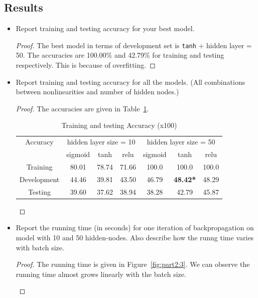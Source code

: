 \documentclass[11pt]{article}
\newcommand{\1}{\mathbf{1}}
\begin{document}
{\subsection{Results}
\begin{itemize}
  \item Report training and testing accuracy for your best model.
  \begin{proof}
    The best model in terms of development set is {\tt tanh} + hidden layer = 50. The accuracies are 100.00\% and 42.79\% for training and testing respectively. This is because of overfitting. 
  \end{proof}{}
  \item Report training and testing accuracy for all the models. (All combinations between nonlinearities and number of hidden nodes.)
  \begin{proof}
    The accuracies are given in Table~\ref{tb:part2:2}. 
    \begin{table}[htbp]
    \centering{}
    \begin{tabular}{c|c|c|c|c|c|c}
    \hline
    Accuracy & \multicolumn{3}{c|}{hidden layer size = 10} & \multicolumn{3}{c}{hidden layer size = 50} \\ \cline{2-7}
     & sigmoid & tanh & relu & sigmoid & tanh & relu \\ \hline
    Training & 80.01 & 78.74 &  71.66 & 100.0 & 100.0 & 100.0 \\ \hline
    Development & 44.46 & 39.81 &  43.50  & 46.79 & \bf 48.42* & 48.29 \\ \hline
    Testing & 39.60 & 37.62 & 38.94 & 38.28 & 42.79 & 45.87 \\ \hline
    \end{tabular}
    \caption{Training and testing Accuracy (x100)}
    \label{tb:part2:2}
    \end{table}
  \end{proof}
  \item Report the running time (in seconds) for one iteration of backpropagation on model with 10 and 50 hidden-nodes. Also describe how the runng time varies with batch size.
  \begin{proof}
    The running time is given in Figure~\ref{fig:part2:3}. We can observe the running time almost grows linearly with the batch size.
    \begin{figure}[htbp]
    \centering

\end{figure}
\end{proof}
\end{itemize}}
\end{document}
